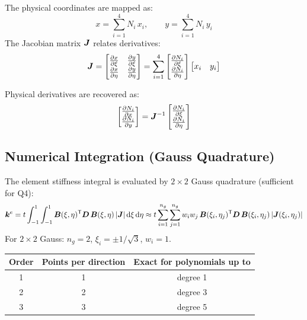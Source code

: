 The physical coordinates are mapped as:
\begin{equation}
    x = \sum_{i=1}^4 N_i\, x_i, \qquad y = \sum_{i=1}^4 N_i\, y_i
    \label{eq:q4_map}
\end{equation}
The Jacobian matrix $\bm{J}$ relates derivatives:
\begin{equation}
    \bm{J} = \begin{bmatrix} \frac{\partial x}{\partial \xi} & \frac{\partial y}{\partial \xi} \\ \frac{\partial x}{\partial \eta} & \frac{\partial y}{\partial \eta} \end{bmatrix}
    = \sum_{i=1}^4
    \begin{bmatrix} \frac{\partial N_i}{\partial \xi} \\ \frac{\partial N_i}{\partial \eta} \end{bmatrix}
    \begin{bmatrix} x_i & y_i \end{bmatrix}
    \label{eq:jacobian}
\end{equation}

Physical derivatives are recovered as:
\begin{equation}
    \begin{bmatrix} \frac{\partial N_i}{\partial x} \\ \frac{\partial N_i}{\partial y} \end{bmatrix}
    = \bm{J}^{-1}
    \begin{bmatrix} \frac{\partial N_i}{\partial \xi} \\ \frac{\partial N_i}{\partial \eta} \end{bmatrix}
\end{equation}

\subsection{Numerical Integration (Gauss Quadrature)}

The element stiffness integral is evaluated by $2\times2$ Gauss quadrature
(sufficient for Q4):
\begin{equation}
    \bm{k}^e = t \int_{-1}^{1}\int_{-1}^{1}
    \bm{B}(\xi,\eta)^{\mathsf{T}} \bm{D}\, \bm{B}(\xi,\eta)\, |\bm{J}| \,\mathrm{d}\xi\,\mathrm{d}\eta
    \approx t \sum_{i=1}^{n_g} \sum_{j=1}^{n_g} w_i w_j\,
    \bm{B}(\xi_i,\eta_j)^{\mathsf{T}} \bm{D}\, \bm{B}(\xi_i,\eta_j)\, |\bm{J}(\xi_i,\eta_j)|
    \label{eq:q4_stiffness}
\end{equation}
For $2\times2$ Gauss: $n_g=2$, $\xi_i = \pm 1/\sqrt{3}$, $w_i = 1$.

\begin{center}
\begin{tabular}{@{}ccc@{}}
    \toprule
    Order & Points per direction & Exact for polynomials up to \\
    \midrule
    1 & 1 & degree 1 \\
    2 & 2 & degree 3 \\
    3 & 3 & degree 5 \\
    \bottomrule
\end{tabular}
\end{center}

